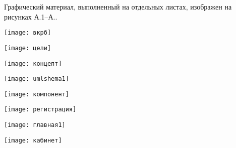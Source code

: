 
Графический материал, выполненный на отдельных листах,
изображен на рисунках А.1--А..
\setcounter{числоПлакатов}{0}

\renewcommand{\thefigure}{А.\arabic{figure}} %

\begin{landscape}
\begin{плакат}
	\centering
    \texttt{[image: вкрб]}
    \label{pl1:image}      
\end{плакат}

\begin{плакат}
	\centering
    \texttt{[image: цели]}
    \label{pl2:image}      
\end{плакат}

\begin{плакат}
	\centering
    \texttt{[image: концепт]}
    \label{pl3:image}      
\end{плакат}

\begin{плакат}
	\centering
    \texttt{[image: umlshema1]}
    \label{pl4:image}      
\end{плакат}

\begin{плакат}
	\centering
	\texttt{[image: компонент]}
	\label{pl5:image}      
\end{плакат}

\begin{плакат}
	\centering
	\texttt{[image: регистрация]}
	\label{pl6:image}      
\end{плакат}

\begin{плакат}
	\centering
	\texttt{[image: главная1]}
	\label{pl7:image}      
\end{плакат}

\begin{плакат}
	\centering
	\texttt{[image: кабинет]}
	\label{pl8:image}      
\end{плакат}


\end{landscape}
